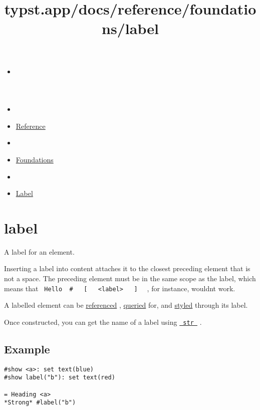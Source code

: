 \title{typst.app/docs/reference/foundations/label}

\begin{itemize}
\tightlist
\item
  \href{/docs}{}
\item
  
\item
  \href{/docs/reference/}{Reference}
\item
  
\item
  \href{/docs/reference/foundations/}{Foundations}
\item
  
\item
  \href{/docs/reference/foundations/label/}{Label}
\end{itemize}

\section{\texorpdfstring{{ label }}{ label }}\label{summary}

A label for an element.

Inserting a label into content attaches it to the closest preceding
element that is not a space. The preceding element must be in the same
scope as the label, which means that
\texttt{\ Hello\ }{\texttt{\ \#\ }}\texttt{\ }{\texttt{\ {[}\ }}\texttt{\ }{\texttt{\ \textless{}label\textgreater{}\ }}\texttt{\ }{\texttt{\ {]}\ }}\texttt{\ }
, for instance, wouldn\textquotesingle t work.

A labelled element can be \href{/docs/reference/model/ref/}{referenced}
, \href{/docs/reference/introspection/query/}{queried} for, and
\href{/docs/reference/styling/}{styled} through its label.

Once constructed, you can get the name of a label using
\href{/docs/reference/foundations/str/\#constructor}{\texttt{\ str\ }} .

\subsection{Example}\label{example}

\begin{verbatim}
#show <a>: set text(blue)
#show label("b"): set text(red)

= Heading <a>
*Strong* #label("b")
\end{verbatim}

